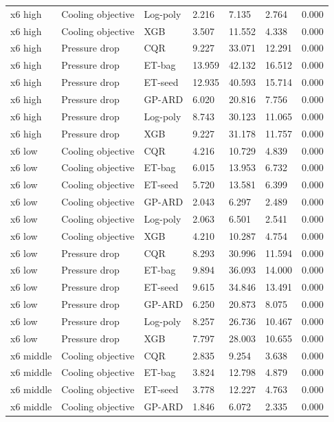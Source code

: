 \begin{longtable}{lllllll}
x6 high & Cooling objective & Log-poly & 2.216 & 7.135 & 2.764 & 0.000\\
x6 high & Cooling objective & XGB & 3.507 & 11.552 & 4.338 & 0.000\\
x6 high & Pressure drop & CQR & 9.227 & 33.071 & 12.291 & 0.000\\
x6 high & Pressure drop & ET-bag & 13.959 & 42.132 & 16.512 & 0.000\\
x6 high & Pressure drop & ET-seed & 12.935 & 40.593 & 15.714 & 0.000\\
x6 high & Pressure drop & GP-ARD & 6.020 & 20.816 & 7.756 & 0.000\\
x6 high & Pressure drop & Log-poly & 8.743 & 30.123 & 11.065 & 0.000\\
x6 high & Pressure drop & XGB & 9.227 & 31.178 & 11.757 & 0.000\\
x6 low & Cooling objective & CQR & 4.216 & 10.729 & 4.839 & 0.000\\
x6 low & Cooling objective & ET-bag & 6.015 & 13.953 & 6.732 & 0.000\\
x6 low & Cooling objective & ET-seed & 5.720 & 13.581 & 6.399 & 0.000\\
x6 low & Cooling objective & GP-ARD & 2.043 & 6.297 & 2.489 & 0.000\\
x6 low & Cooling objective & Log-poly & 2.063 & 6.501 & 2.541 & 0.000\\
x6 low & Cooling objective & XGB & 4.210 & 10.287 & 4.754 & 0.000\\
x6 low & Pressure drop & CQR & 8.293 & 30.996 & 11.594 & 0.000\\
x6 low & Pressure drop & ET-bag & 9.894 & 36.093 & 14.000 & 0.000\\
x6 low & Pressure drop & ET-seed & 9.615 & 34.846 & 13.491 & 0.000\\
x6 low & Pressure drop & GP-ARD & 6.250 & 20.873 & 8.075 & 0.000\\
x6 low & Pressure drop & Log-poly & 8.257 & 26.736 & 10.467 & 0.000\\
x6 low & Pressure drop & XGB & 7.797 & 28.003 & 10.655 & 0.000\\
x6 middle & Cooling objective & CQR & 2.835 & 9.254 & 3.638 & 0.000\\
x6 middle & Cooling objective & ET-bag & 3.824 & 12.798 & 4.879 & 0.000\\
x6 middle & Cooling objective & ET-seed & 3.778 & 12.227 & 4.763 & 0.000\\
x6 middle & Cooling objective & GP-ARD & 1.846 & 6.072 & 2.335 & 0.000\\

\end{longtable}
